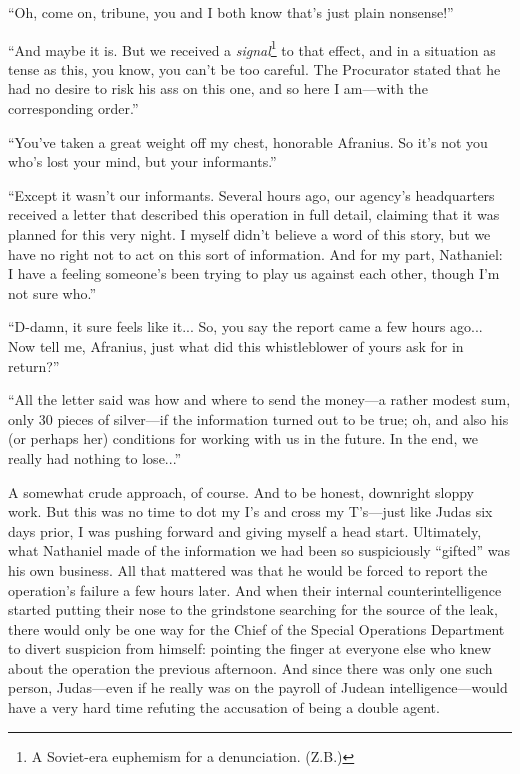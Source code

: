 ``Oh, come on, tribune, you and I both know that's just plain nonsense!'' 

``And maybe it is. But we received a \emph{signal}\footnote{A Soviet-era euphemism for a denunciation. (Z.B.)} to that effect, and in a situation as tense as this, you know, you can't be too careful. The Procurator stated that he had no desire to risk his ass on this one, and so here I am---with the corresponding order.''

``You've taken a great weight off my chest, honorable Afranius. So it's not you who's lost your mind, but your informants.''

``Except it wasn't our informants. Several hours ago, our agency's headquarters received a letter that described this operation in full detail, claiming that it was planned for this very night. I myself didn't believe a word of this story, but we have no right not to act on this sort of information. And for my part, Nathaniel: I have a feeling someone's been trying to play us against each other, though I'm not sure who.''

``D-damn, it sure feels like it... So, you say the report came a few hours ago... Now tell me, Afranius, just what did this whistleblower of yours ask for in return?''

``All the letter said was how and where to send the money---a rather modest sum, only 30 pieces of silver---if the information turned out to be true; oh, and also his (or perhaps her) conditions for working with us in the future. In the end, we really had nothing to lose...''

A somewhat crude approach, of course. And to be honest, downright sloppy work. But this was no time to dot my I's and cross my T's---just like Judas six days prior, I was pushing forward and giving myself a head start. Ultimately, what Nathaniel made of the information we had been so suspiciously ``gifted'' was his own business. All that mattered was that he would be forced to report the operation's failure a few hours later. And when their internal counterintelligence started putting their nose to the grindstone searching for the source of the leak, there would only be one way for the Chief of the Special Operations Department to divert suspicion from himself: pointing the finger at everyone else who knew about the operation the previous afternoon. And since there was only one such person, Judas---even if he really was on the payroll of Judean intelligence---would have a very hard time refuting the accusation of being a double agent.

